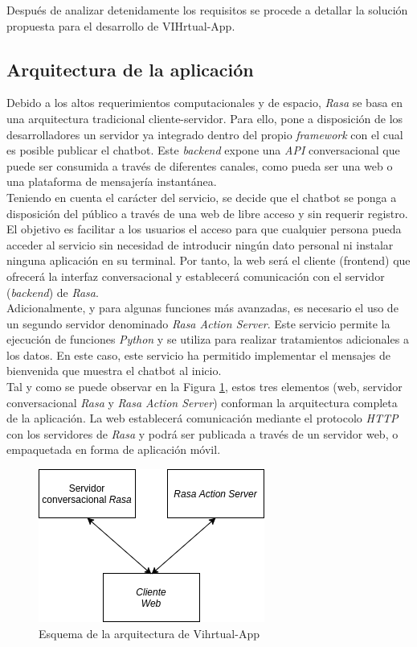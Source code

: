 Después de analizar detenidamente los requisitos se procede a detallar la solución propuesta para el desarrollo de VIHrtual-App.

\subsection{Arquitectura de la aplicación}
\label{arquitectura}
Debido a los altos requerimientos computacionales y de espacio, \textit{Rasa} se basa en una arquitectura tradicional cliente-servidor. Para ello, pone a disposición de los desarrolladores un servidor ya integrado dentro del propio \textit{framework} con el cual es posible publicar el chatbot. Este \textit{backend} expone una \textit{API} conversacional que puede ser consumida a través de diferentes canales, como pueda ser una web o una plataforma de mensajería instantánea.\\

Teniendo en cuenta el carácter del servicio, se decide que el chatbot se ponga a disposición del público a través de una web de libre acceso y sin requerir registro. El objetivo es facilitar a los usuarios el acceso para que cualquier persona pueda acceder al servicio sin necesidad de introducir ningún dato personal ni instalar ninguna aplicación en su terminal. Por tanto, la web será el cliente (frontend) que ofrecerá la interfaz conversacional y establecerá comunicación con el servidor (\textit{backend}) de \textit{Rasa}.\\

Adicionalmente, y para algunas funciones más avanzadas, es necesario el uso de un segundo servidor denominado \textit{Rasa Action Server}. Este servicio permite la ejecución de funciones \textit{Python} y se utiliza para realizar tratamientos adicionales a los datos. En este caso, este servicio ha permitido implementar el mensajes de bienvenida que muestra el chatbot al inicio.\\

Tal y como se puede observar en la Figura \ref{fig:appStruct}, estos tres elementos (web, servidor conversacional \textit{Rasa} y \textit{Rasa Action Server}) conforman la arquitectura completa de la aplicación. La web establecerá comunicación mediante el protocolo \textit{HTTP} con los servidores de \textit{Rasa} y podrá ser publicada a través de un servidor web, o empaquetada en forma de aplicación móvil.

\begin{figure}[htbp]
\centering
\includegraphics[scale=0.2]{../images/app_structure.png} 
\caption{Esquema de la arquitectura de Vihrtual-App}
\label{fig:appStruct}
\end{figure}

